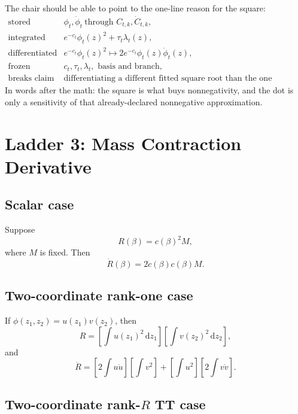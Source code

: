 \documentclass[11pt]{article}
\newcommand{\dd}{\,\mathrm d}
\begin{document}
The chair should be able to point to the one-line reason for the square:
\[
\begin{array}{ll}
\text{stored} & \phi_t,\dot\phi_t\ \text{through } C_{t,k},\dot C_{t,k},\\[1mm]
\text{integrated} & e^{-c_t}\phi_t(z)^2+\tau_t\lambda_t(z),\\[1mm]
\text{differentiated} &
    e^{-c_t}\phi_t(z)^2
    \mapsto 2e^{-c_t}\phi_t(z)\dot\phi_t(z),\\[1mm]
\text{frozen} & c_t,\tau_t,\lambda_t,\text{ basis and branch},\\[1mm]
\text{breaks claim} &
    \text{differentiating a different fitted square root than the one squared.}
\end{array}
\tag{P21-30a}
\]
In words after the math: the square is what buys nonnegativity, and the dot is
only a sensitivity of that already-declared nonnegative approximation.

\section{Ladder 3: Mass Contraction Derivative}

\subsection*{Scalar case}

Suppose
\[
    R(\beta)=c(\beta)^2M,
    \tag{P21-31}
\]
where \(M\) is fixed.  Then
\[
    \dot R(\beta)=2\dot c(\beta)c(\beta)M.
    \tag{P21-32}
\]

\subsection*{Two-coordinate rank-one case}

If \(\phi(z_1,z_2)=u(z_1)v(z_2)\), then
\[
    R
    =
    \left[\int u(z_1)^2\dd z_1\right]
    \left[\int v(z_2)^2\dd z_2\right],
    \tag{P21-33}
\]
and
\[
    \dot R
    =
    \left[2\int u\dot u\right]\left[\int v^2\right]
    +
    \left[\int u^2\right]\left[2\int v\dot v\right].
    \tag{P21-34}
\]

\subsection*{Two-coordinate rank-\(R\) TT case}
\end{document}
